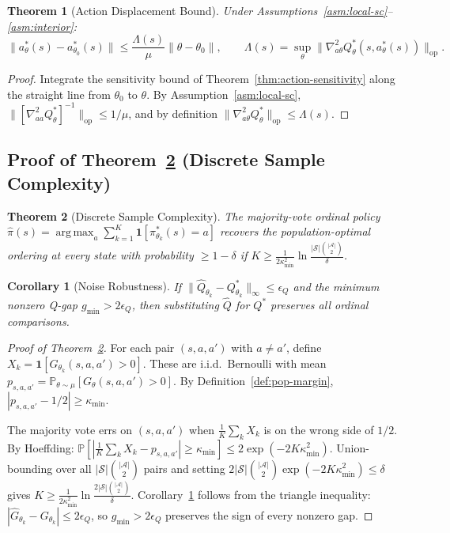 \documentclass{article}
\newtheorem{theorem}{Theorem}
\newtheorem{corollary}{Corollary}
\newcommand{\Prob}{\mathbb{P}}
\newcommand{\ind}{\mathbf{1}}
\newcommand{\cS}{\mathcal{S}}
\newcommand{\cA}{\mathcal{A}}
\DeclareMathOperator*{\argmax}{arg\,max}
\begin{document}
\begin{theorem}[Action Displacement Bound]
\label{thm:action-displacement}
Under Assumptions~\ref{asm:local-sc}--\ref{asm:interior}:
\[
\|a^*_{\theta}(s) - a^*_{\theta_0}(s)\| \leq \frac{\Lambda(s)}{\mu}\|\theta - \theta_0\|, \qquad \Lambda(s) = \sup_\theta\|\nabla^2_{a\theta}Q^*_\theta(s,a^*_\theta(s))\|_{\mathrm{op}}.
\]
\end{theorem}
\begin{proof}
Integrate the sensitivity bound of Theorem~\ref{thm:action-sensitivity} along the straight line from $\theta_0$ to $\theta$. By Assumption~\ref{asm:local-sc}, $\|[\nabla^2_{aa}Q^*_\theta]^{-1}\|_{\mathrm{op}} \leq 1/\mu$, and by definition $\|\nabla^2_{a\theta}Q^*_\theta\|_{\mathrm{op}} \leq \Lambda(s)$.
\end{proof}

\subsection{Proof of Theorem~\ref{thm:sample-complexity} (Discrete Sample Complexity)}

\begin{theorem}[Discrete Sample Complexity]
\label{thm:sample-complexity}
The majority-vote ordinal policy $\hat{\pi}(s) = \argmax_a \sum_{k=1}^K \ind[\pi^*_{\theta_k}(s) = a]$ recovers the population-optimal ordering at every state with probability $\geq 1 - \delta$ if $K \geq \frac{1}{2\kappa_{\min}^2}\ln\frac{|\cS|\binom{|\cA|}{2}}{\delta}$.
\end{theorem}

\begin{corollary}[Noise Robustness]
\label{cor:noisy-q}
If $\|\hat{Q}_{\theta_k} - Q^*_{\theta_k}\|_\infty \leq \epsilon_Q$ and the minimum nonzero Q-gap $g_{\min} > 2\epsilon_Q$, then substituting $\hat{Q}$ for $Q^*$ preserves all ordinal comparisons.
\end{corollary}

\begin{proof}[Proof of Theorem~\ref{thm:sample-complexity}]
For each pair $(s, a, a')$ with $a \neq a'$, define $X_k = \ind[G_{\theta_k}(s,a,a') > 0]$. These are i.i.d.\ Bernoulli with mean $p_{s,a,a'} = \Prob_{\theta \sim \mu}[G_\theta(s,a,a') > 0]$. By Definition~\ref{def:pop-margin}, $|p_{s,a,a'} - 1/2| \geq \kappa_{\min}$.

The majority vote errs on $(s,a,a')$ when $\frac{1}{K}\sum_k X_k$ is on the wrong side of $1/2$. By Hoeffding:
$\Prob\left[\left|\frac{1}{K}\sum_k X_k - p_{s,a,a'}\right| \geq \kappa_{\min}\right] \leq 2\exp(-2K\kappa_{\min}^2)$.
Union-bounding over all $|\cS|\binom{|\cA|}{2}$ pairs and setting $2|\cS|\binom{|\cA|}{2}\exp(-2K\kappa_{\min}^2) \leq \delta$ gives $K \geq \frac{1}{2\kappa_{\min}^2}\ln\frac{2|\cS|\binom{|\cA|}{2}}{\delta}$. Corollary~\ref{cor:noisy-q} follows from the triangle inequality: $|\hat{G}_{\theta_k} - G_{\theta_k}| \leq 2\epsilon_Q$, so $g_{\min} > 2\epsilon_Q$ preserves the sign of every nonzero gap.
\end{proof}
\end{document}
